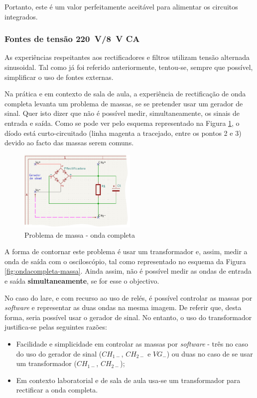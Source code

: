 Portanto, este é um valor perfeitamente aceitável para alimentar os circuitos integrados.

\subsubsection{Fontes de tensão \SI{220}{\volt}/\SI{8}{\volt} CA}
\label{sec:fontealternada}
As experiências respeitantes aos rectificadores e filtros utilizam tensão alternada sinusoidal. Tal como já foi referido anteriormente, tentou-se, sempre que possível, simplificar o uso de fontes externas. 

Na prática e em contexto de sala de aula, a experiência de rectificação de onda completa levanta um problema de massas, se se pretender usar um gerador de sinal. Quer isto dizer que não é possível medir, simultaneamente, os sinais de entrada e saída. Como se pode ver pelo esquema representado na Figura \ref{fig:gerador-massa}, o díodo está curto-circuitado (linha magenta a tracejado, entre os pontos 2 e 3) devido ao facto das massas serem comuns. 

\begin{figure}[hbtp]
	\centering
	\includegraphics[width=0.5\textwidth]{figures/sch_completa_CC.png}
	\caption{Problema de massa - onda completa}
	\label{fig:gerador-massa}
\end{figure}

A forma de contornar este problema é usar um transformador e, assim, medir a onda de saída com o osciloscópio, tal como representado no esquema da Figura \ref{fig:ondacompleta-massa}. Ainda assim, não é possível medir as ondas de entrada e saída \textbf{simultaneamente}, se for esse o objectivo.

No caso do \acrshort{lare}, e com recurso ao uso de relés, é possível controlar as massas por \textit{software} e representar as duas ondas na mesma imagem.
De referir que, desta forma, seria possível usar o gerador de sinal. No entanto, o uso do transformador justifica-se pelas seguintes razões:
\begin{itemize}
	\item Facilidade e simplicidade em controlar as massas por \textit{software} - três no caso do uso do gerador de sinal ($CH_{1-}$, $CH_{2-}$ e $VG_{-}$) ou duas no caso de se usar um transformador ($CH_{1-}$, $CH_{2-}$);
	\item Em contexto laboratorial e de sala de aula usa-se um transformador para rectificar a onda completa.
\end{itemize}

